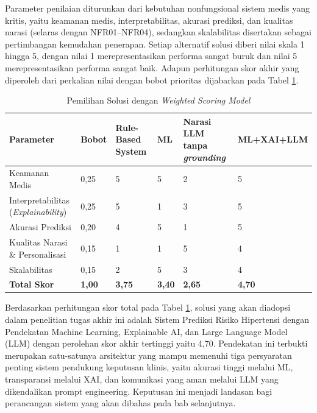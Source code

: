 Parameter penilaian diturunkan dari kebutuhan nonfungsional sistem medis yang kritis, yaitu keamanan medis, interpretabilitas, akurasi prediksi, dan kualitas narasi (selaras dengan NFR01--NFR04), sedangkan skalabilitas disertakan sebagai pertimbangan kemudahan penerapan. Setiap alternatif solusi diberi nilai skala 1 hingga 5, dengan nilai 1 merepresentasikan performa sangat buruk dan nilai 5 merepresentasikan performa sangat baik. Adapun perhitungan skor akhir yang diperoleh dari perkalian nilai dengan bobot prioritas dijabarkan pada Tabel \ref{tab:pemilihan-solusi}.

\begin{table}[H]
    \caption{Pemilihan Solusi dengan \emph{Weighted Scoring Model}}
    \label{tab:pemilihan-solusi}
    \centering
    \small
    \begin{tabular}{|p{3cm}|p{1cm}|p{2cm}|p{2.2cm}|p{2.2cm}|p{3cm}|}
        \hline
        \textbf{Parameter} & \textbf{Bobot} & \textbf{Rule-Based System} & \textbf{ML} & \textbf{Narasi LLM tanpa \emph{grounding}} & \textbf{ML+XAI+LLM} \\
        \hline
        Keamanan Medis & 0,25 & 5 & 5 & 2 & 5 \\
        \hline
        Interpretabilitas (\emph{Explainability}) & 0,25 & 5 & 1 & 3 & 5 \\
        \hline
        Akurasi Prediksi  & 0,20 & 4 & 5 & 1 & 5 \\
        \hline
        Kualitas Narasi \& Personalisasi & 0,15 & 1 & 1 & 5 & 4 \\
        \hline
        Skalabilitas & 0,15 & 2 & 5 & 3 & 4 \\
        \hline
        \textbf{Total Skor} & \textbf{1,00} & \textbf{3,75} & \textbf{3,40} & \textbf{2,65} & \textbf{4,70} \\
        \hline
    \end{tabular}
\end{table}

Berdasarkan perhitungan skor total pada Tabel \ref{tab:pemilihan-solusi}, solusi yang akan diadopsi dalam penelitian tugas akhir ini adalah Sistem Prediksi Risiko Hipertensi dengan Pendekatan Machine Learning, Explainable AI, dan Large Language Model (LLM) dengan perolehan skor akhir tertinggi yaitu 4,70. Pendekatan ini terbukti merupakan satu-satunya arsitektur yang mampu memenuhi tiga persyaratan penting sistem pendukung keputusan klinis, yaitu akurasi tinggi melalui ML, transparansi melalui XAI, dan komunikasi yang aman melalui LLM yang dikendalikan prompt engineering. Keputusan ini menjadi landasan bagi perancangan sistem yang akan dibahas pada bab selanjutnya.